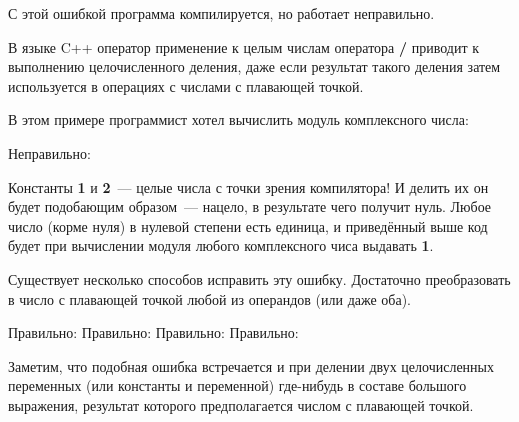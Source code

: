 \begin{typerror}
	\label{TE_integer-division}

	С этой ошибкой программа компилируется, но работает неправильно.

	В языке C++ оператор применение к целым числам оператора \textbf{/}
	приводит к выполнению целочисленного деления,
	даже если результат такого деления затем используется в операциях с числами с плавающей точкой.

	В этом примере программист хотел вычислить модуль комплексного числа:


	Неправильно:

	Константы \textbf{1} и \textbf{2}~--- целые числа с точки зрения компилятора!
	И делить их он будет подобающим образом~--- нацело, в результате чего получит нуль.
	Любое число (корме нуля) в нулевой степени есть единица,
	и приведённый выше код будет при вычислении модуля любого комплексного чиса выдавать \textbf{1}.

	Существует несколько способов исправить эту ошибку.
	Достаточно преобразовать в число с плавающей точкой любой из операндов (или даже оба).


	Правильно:
	Правильно:
	Правильно:
	Правильно:

	Заметим, что подобная ошибка встречается и при делении двух целочисленных переменных
	(или константы и переменной)
	где-нибудь в составе большого выражения,
	результат которого предполагается числом с плавающей точкой.

\end{typerror}
